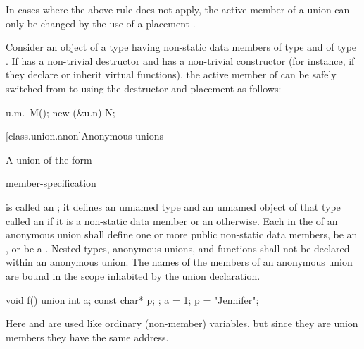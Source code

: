 \pnum
\begin{note}
In cases where the above rule does not apply,
the active member of a union can only be changed by
the use of a placement .
\end{note}
\begin{example}
Consider an object  of a  type  having non-static data members
 of type  and  of type . If  has a non-trivial
destructor and  has a non-trivial constructor (for instance, if they declare or inherit
virtual functions), the active member of  can be safely switched from  to
 using the destructor and placement  as follows:

\begin{codeblock}
u.m.~M();
new (&u.n) N;
\end{codeblock}
\end{example}

[class.union.anon]{Anonymous unions}
%

\pnum
{}%
%
A union of the form
\begin{ncsimplebnf}
 \terminal{\{} member-specification \terminal{\}} \terminal{;}
\end{ncsimplebnf}
is called an ; it defines an unnamed type and
an unnamed object of that type called
an 
if it is a non-static data member or
an  otherwise.
%
%
Each  in the 
of an anonymous union shall define one or more public non-static data members,
be an , or
be a .
Nested types, anonymous unions, and functions
shall not be declared within an anonymous union.
The names of the members of an anonymous union
are bound in the scope inhabited by the union declaration.
\begin{example}
\begin{codeblock}
void f() {
  union { int a; const char* p; };
  a = 1;
  p = "Jennifer";
}
\end{codeblock}

Here  and  are used like ordinary (non-member)
variables, but since they are union members they have the same address.
\end{example}

